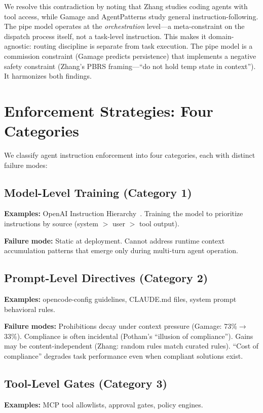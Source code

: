 \documentclass[11pt,a4paper]{article}
\begin{document}
We resolve this contradiction by noting that Zhang studies coding agents with tool access, while Gamage and AgentPatterns study general instruction-following. The pipe model operates at the \emph{orchestration} level---a meta-constraint on the dispatch process itself, not a task-level instruction. This makes it domain-agnostic: routing discipline is separate from task execution. The pipe model is a commission constraint (Gamage predicts persistence) that implements a negative safety constraint (Zhang's PBRS framing---``do not hold temp state in context''). It harmonizes both findings.

\section{Enforcement Strategies: Four Categories}
\label{sec:enforcement}

We classify agent instruction enforcement into four categories, each with distinct failure modes:

\subsection{Model-Level Training (Category 1)}
\textbf{Examples:} OpenAI Instruction Hierarchy~\cite{wallace2024}. Training the model to prioritize instructions by source (system $>$ user $>$ tool output).

\textbf{Failure mode:} Static at deployment. Cannot address runtime context accumulation patterns that emerge only during multi-turn agent operation.

\subsection{Prompt-Level Directives (Category 2)}
\textbf{Examples:} opencode-config guidelines, CLAUDE.md files, system prompt behavioral rules.

\textbf{Failure modes:} Prohibitions decay under context pressure (Gamage: 73\%$\to$33\%). Compliance is often incidental (Potham's ``illusion of compliance''). Gains may be content-independent (Zhang: random rules match curated rules). ``Cost of compliance'' degrades task performance even when compliant solutions exist.

\subsection{Tool-Level Gates (Category 3)}
\textbf{Examples:} MCP tool allowlists, approval gates, policy engines.
\end{document}
